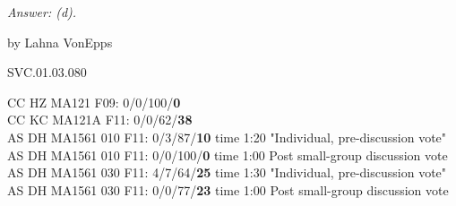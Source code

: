 {\it Answer: (d).}

\medskip
by Lahna VonEpps

SVC.01.03.080


CC HZ MA121 F09: 0/0/100/{\bf0}  \\
CC KC MA121A F11: 0/0/62/{\bf38}  \\
AS DH MA1561 010 F11: 0/3/87/{\bf10} time 1:20 "Individual, pre-discussion vote" \\
AS DH MA1561 010 F11: 0/0/100/{\bf0} time 1:00 Post small-group discussion vote \\
AS DH MA1561 030 F11: 4/7/64/{\bf25} time 1:30 "Individual, pre-discussion vote" \\
AS DH MA1561 030 F11: 0/0/77/{\bf23} time 1:00 Post small-group discussion vote \\
